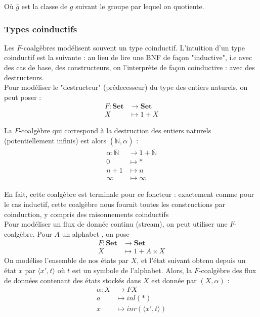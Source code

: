 \documentclass{article}
\newcommand{\N}{\mathbb{N}}
\begin{document}
Où $\bar{g}$ est la classe de $g$ suivant le groupe par lequel on quotiente. 

\subsubsection{Types coinductifs}
Les $F$-coalgèbres  modélisent  souvent un type coinductif. L'intuition d'un type coinductif est la suivante : au lieu de lire une BNF de façon "inductive", i.e avec des cas de base, des constructeurs, on l'interprète de façon coinductive : avec des destructeurs.  \\

Pour modéliser le "destructeur" (prédecesseur) du type des entiers naturels, on peut poser : 
\begin{align*}
    F : \mathbf{Set} & \rightarrow \mathbf{Set} \\ 
        X & \mapsto 1 + X
\end{align*}

La $F$-coalgèbre qui correspond à la destruction des entiers naturels (potentiellement infinis) est alors $(\bar{\N}, \alpha)$ : 
\begin{align*}
    \alpha : \bar{\N} &\rightarrow 1 + \bar{\N} \\ 
            0 &\mapsto * \\ 
            n+1 & \mapsto n \\
            \infty & \mapsto \infty
\end{align*}

En fait, cette coalgèbre est terminale pour ce foncteur : exactement comme pour le cas inductif, cette coalgèbre nous fournit toutes les constructions par coinduction, y compris des raisonnements coinductifs
\\

Pour modéliser un flux de donnée continu (stream), on peut utiliser une $F$-coalgèbre. Pour $A$ un alphabet ,  on pose
\begin{align*}
    F : \mathbf{Set} & \rightarrow \mathbf{Set} \\ 
        X & \mapsto 1 + A \times X
\end{align*}
On modélise l'ensemble de nos états par $X$, et l'état suivant obtenu depuis un état $x$ par $\langle x', t \rangle $ où $t$ est un symbole de l'alphabet.
Alors, la $F$-coalgèbre des flux de données contenant des états stockés dans $X$  est donnée par $(X,\alpha)$  : 
\begin{align*}
    \alpha : X & \rightarrow FX \\ 
             a & \mapsto inl(*) \\
             x & \mapsto inr(\langle x', t \rangle)
\end{align*}
\end{document}
